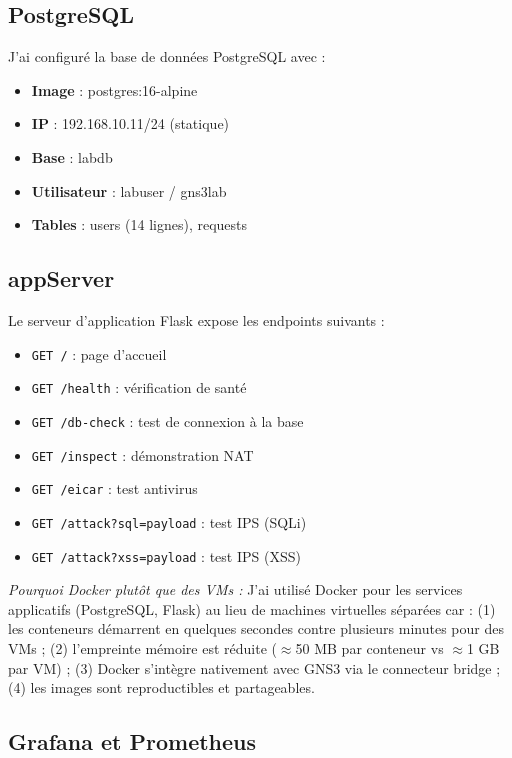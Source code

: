 \subsection{PostgreSQL}

J'ai configuré la base de données PostgreSQL avec :
\begin{itemize}
    \item \textbf{Image} : postgres:16-alpine
    \item \textbf{IP} : 192.168.10.11/24 (statique)
    \item \textbf{Base} : labdb
    \item \textbf{Utilisateur} : labuser / gns3lab
    \item \textbf{Tables} : users (14 lignes), requests
\end{itemize}

\subsection{appServer}

Le serveur d'application Flask expose les endpoints suivants :
\begin{itemize}
    \item \texttt{GET /} : page d'accueil
    \item \texttt{GET /health} : vérification de santé
    \item \texttt{GET /db-check} : test de connexion à la base
    \item \texttt{GET /inspect} : démonstration NAT
    \item \texttt{GET /eicar} : test antivirus
    \item \texttt{GET /attack?sql=payload} : test IPS (SQLi)
    \item \texttt{GET /attack?xss=payload} : test IPS (XSS)
\end{itemize}

\noindent\textit{Pourquoi Docker plutôt que des VMs :} J'ai utilisé Docker pour les services applicatifs (PostgreSQL, Flask) au lieu de machines virtuelles séparées car : (1) les conteneurs démarrent en quelques secondes contre plusieurs minutes pour des VMs ; (2) l'empreinte mémoire est réduite ($\approx$50 MB par conteneur vs $\approx$1 GB par VM) ; (3) Docker s'intègre nativement avec GNS3 via le connecteur bridge ; (4) les images sont reproductibles et partageables.

\subsection{Grafana et Prometheus}

